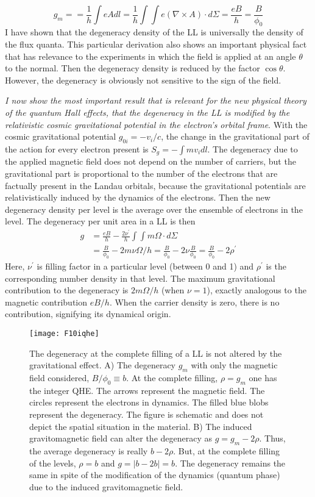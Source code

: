 \documentclass[aps,preprint,12pt,tightenlines]{revtex4}%
\begin{document}
\begin{equation}
g_{m}==\frac{1}{h}\int eAdl=\frac{1}{h}\int\int e\left(\nabla\times
A\right)  \cdot d\Sigma=\frac{eB}{h}=\frac{B}{\phi_{0}}%
\end{equation}
I have shown that the degeneracy density of the LL is universally
the density of the flux quanta. This particular derivation also shows an
important physical fact that has relevance to the experiments in which the
field is applied at an angle $\theta$ to the normal. Then the degeneracy
density is reduced by the factor $\cos\theta$. However, the degeneracy is
obviously not sensitive to the sign of the field.

\emph{I now show the most important result that is relevant for the new
physical theory of the quantum Hall effects, that the degeneracy in the LL
is modified by the relativistic cosmic gravitational potential in the
electron's orbital frame}. With the cosmic gravitational potential
$g_{0i}=-v_{i}/c$, the change in the gravitational part of the action for
every electron present is $S_{g}=-\int mv_{i}dl$. The degeneracy due to the
applied magnetic field does not depend on the number of carriers, but the
gravitational part is proportional to the number of the electrons that are
factually present in the Landau orbitals, because the gravitational
potentials are relativistically induced by the dynamics of the electrons. Then
the new degeneracy density per level is the average over the ensemble of electrons in
the level. The degeneracy per unit area in a LL is then
\begin{align}
g &  =\frac{eB}{h}-\frac{2\nu^\prime}{h}\int\int m\Omega\cdot d\Sigma\nonumber\\
&  =\frac{B}{\phi_{0}}-2m\nu\Omega/h=\frac{B}{\phi_{0}}-2\nu\frac{B}{\phi_{0}%
}=\frac{B}{\phi_{0}}-2\rho^\prime
\end{align}
Here, $\nu^\prime$ is filling factor in a particular level (between 0 and 1) and $\rho^\prime$ is the corresponding number density in that level. The maximum gravitational contribution to the degeneracy is $2m\Omega/h$ (when $\nu=1$), exactly analogous to the magnetic contribution $eB/h$. When the carrier density is zero, there is no contribution, signifying its dynamical origin. 
\begin{figure}
	\centering
	\texttt{[image: F10iqhe]}
	\caption{The degeneracy at the complete filling of a LL is not altered by the gravitational effect. A) The degeneracy $g_m$ with only the magnetic field considered, $B/\phi_{0}\equiv b$. At the complete filling, $\rho=g_m$ one has the integer QHE. The arrows represent the magnetic field. The circles represent the electrons in dynamics. The filled blue blobs represent the degeneracy. The figure is schematic and does not depict the spatial situation in the material. B) The induced gravitomagnetic field can alter the degeneracy as $g=g_m-2\rho$. Thus, the average degeneracy is really $b-2\rho$. But, at the complete filling of the levels, $\rho=b$ and $g=\left\vert b-2b\right\vert =b$. The degeneracy remains the same in spite of the modification of the dynamics (quantum phase) due to the induced gravitomagnetic field.}
	\label{fig:iqhe}
\end{figure}
\end{document}
